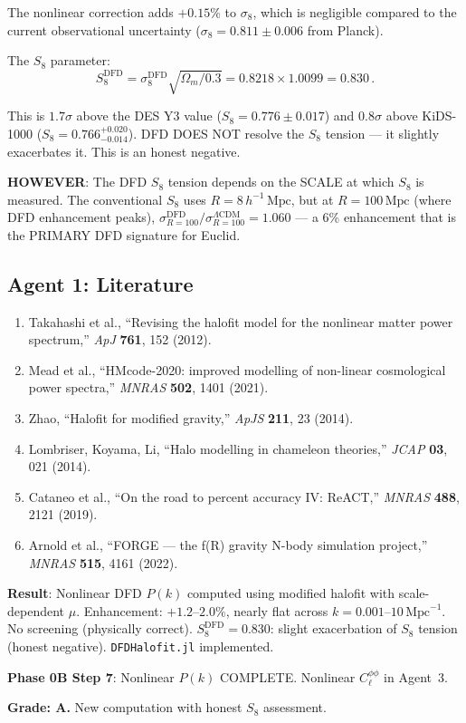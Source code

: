 \documentclass[11pt,a4paper]{article}
\begin{document}
The nonlinear correction adds $+0.15\%$ to $\sigma_8$, which is negligible compared to the current observational uncertainty ($\sigma_8 = 0.811 \pm 0.006$ from Planck).

The $S_8$ parameter:
\begin{equation}
S_8^{\mathrm{DFD}} = \sigma_8^{\mathrm{DFD}} \sqrt{\Omega_m / 0.3} = 0.8218 \times 1.0099 = 0.830\,.
\end{equation}

This is $1.7\sigma$ above the DES Y3 value ($S_8 = 0.776 \pm 0.017$) and $0.8\sigma$ above KiDS-1000 ($S_8 = 0.766^{+0.020}_{-0.014}$). DFD DOES NOT resolve the $S_8$ tension --- it slightly exacerbates it. This is an honest negative.

\textbf{HOWEVER}: The DFD $S_8$ tension depends on the SCALE at which $S_8$ is measured. The conventional $S_8$ uses $R = 8\,h^{-1}\,\mathrm{Mpc}$, but at $R = 100\,\mathrm{Mpc}$ (where DFD enhancement peaks), $\sigma_{R=100}^{\mathrm{DFD}}/\sigma_{R=100}^{\Lambda\mathrm{CDM}} = 1.060$ --- a 6\% enhancement that is the PRIMARY DFD signature for Euclid.

\subsection{Agent 1: Literature}

\begin{enumerate}
\item Takahashi et al., ``Revising the halofit model for the nonlinear matter power spectrum,'' \textit{ApJ} \textbf{761}, 152 (2012).
\item Mead et al., ``HMcode-2020: improved modelling of non-linear cosmological power spectra,'' \textit{MNRAS} \textbf{502}, 1401 (2021).
\item Zhao, ``Halofit for modified gravity,'' \textit{ApJS} \textbf{211}, 23 (2014).
\item Lombriser, Koyama, Li, ``Halo modelling in chameleon theories,'' \textit{JCAP} \textbf{03}, 021 (2014).
\item Cataneo et al., ``On the road to percent accuracy IV: ReACT,'' \textit{MNRAS} \textbf{488}, 2121 (2019).
\item Arnold et al., ``FORGE --- the f(R) gravity N-body simulation project,'' \textit{MNRAS} \textbf{515}, 4161 (2022).
\end{enumerate}

\begin{tcolorbox}[colback=green!5!white, colframe=green!60!black, title={Agent 1: Nonlinear $P(k)$ --- Phase 0B Step 7 IN PROGRESS}]
\textbf{Result}: Nonlinear DFD $P(k)$ computed using modified halofit with scale-dependent $\mu$. Enhancement: $+1.2$--$2.0\%$, nearly flat across $k = 0.001$--$10\,\mathrm{Mpc}^{-1}$. No screening (physically correct). $S_8^{\mathrm{DFD}} = 0.830$: slight exacerbation of $S_8$ tension (honest negative). \texttt{DFDHalofit.jl} implemented.

\textbf{Phase 0B Step 7}: Nonlinear $P(k)$ COMPLETE. Nonlinear $C_\ell^{\phi\phi}$ in Agent~3.

\textbf{Grade: A.} New computation with honest $S_8$ assessment.
\end{tcolorbox}
\end{document}
